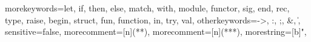   {morekeywords={let, if, then, else, match, with, module,
      functor, sig, end, rec, type, raise, begin, struct, fun, function,
      in, try, val},
    otherkeywords={->, :, ;, \&, \|},
    sensitive=false,
    morecomment=[n]{(*}{*)},   %
    morecomment=[n]{(**}{*)},  %
    morestring=[b]",
  }

\newcommand{\setlangocaml}{
\lstset{
  language=MyOCaml, tabsize=2, frame=single, breaklines=true,
  basicstyle=\ttfamily, framexleftmargin=1mm, xleftmargin=1mm
}
}
